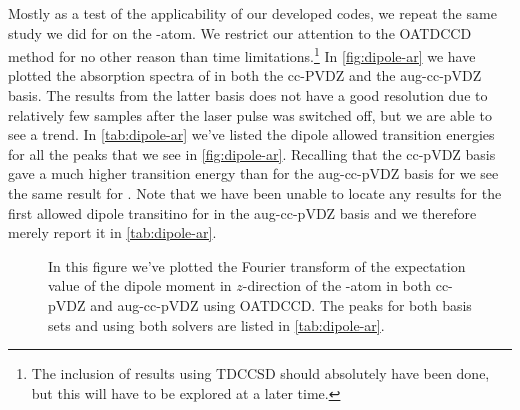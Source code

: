         Mostly as a test of the applicability of our developed codes, we repeat
        the same study we did for  on the -atom.
        We restrict our attention to the OATDCCD method for no other reason than
        time limitations.\footnote{%
            The inclusion of results using TDCCSD should absolutely have been
            done, but this will have to be explored at a later time.
        }
        In \autoref{fig:dipole-ar} we have plotted the absorption spectra of
         in both the cc-PVDZ and the aug-cc-pVDZ basis.
        The results from the latter basis does not have a good resolution due to
        relatively few samples after the laser pulse was switched off, but we
        are able to see a trend.
        In \autoref{tab:dipole-ar} we've listed the dipole allowed transition
        energies for all the peaks that we see in \autoref{fig:dipole-ar}.
        Recalling that the cc-pVDZ basis gave a much higher transition energy
        than for the aug-cc-pVDZ basis for  we see the same result for
        .
        Note that we have been unable to locate any results for the first
        allowed dipole transitino for  in the aug-cc-pVDZ basis and we
        therefore merely report it in \autoref{tab:dipole-ar}.
        \begin{figure}
            \centering
            \caption{In this figure we've plotted the Fourier transform of the
            expectation value of the dipole moment in $z$-direction of the
            -atom in both cc-pVDZ and aug-cc-pVDZ using OATDCCD.
            The peaks for both basis sets and using both solvers are listed in
            \autoref{tab:dipole-ar}.}
            \label{fig:dipole-ar}
        \end{figure}

